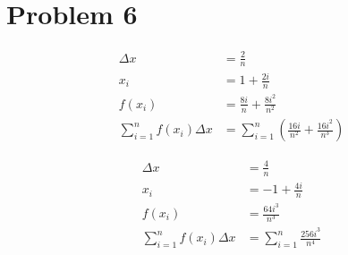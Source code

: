 \documentclass[preview, margin=0.6in]{standalone}
\newcommand*{\problem}[1]{\section*{Problem #1}}
\begin{document}
\problem{6}
\begin{minipage}{0.49\linewidth}
\begin{align*}
	\Delta x&=\frac2n \\ 
	x_i&=1+\frac{2i}n \\ 
	f(x_i)&=\frac{8i}{n}+\frac{8i^2}{n^{2}} \\ 
	\sum_{i=1}^{n}f(x_i)\Delta x&=\sum_{i=1}^{n}\left(\frac{16i}{n^2}+\frac{16i^2}{n^3}\right)
\end{align*}
\end{minipage}
\begin{minipage}{0.49\linewidth}
\begin{align*}
	\Delta x&=\frac4n \\ 
	x_i&=-1+\frac{4i}n \\ 
	f(x_i)&=\frac{64i^3}{n^3} \\ 
	\sum_{i=1}^{n}f(x_i)\Delta x&=\sum_{i=1}^{n}\frac{256i^3}{n^4}
\end{align*}
\end{minipage}
\end{document}

